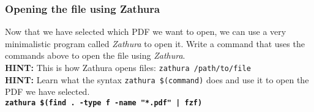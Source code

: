 \documentclass[titlepage, 12pt]{article}
\newcommand{\code}{\texttt}
\begin{document}
	\subsubsection{Opening the file using Zathura}
	Now that we have selected which PDF we want to open, we can use a very minimalistic program called \textit{Zathura} to open it. Write a command that uses the commands above to open the file using \textit{Zathura}.
	\\
	\textbf{HINT:} This is how Zathura opens files: \code{zathura /path/to/file}
	\\
	\textbf{HINT:} Learn what the syntax \code{zathura \$(command)} does and use it to open the PDF we have selected.
	\\
	\textbf{\code{zathura \$(find . -type f -name "*.pdf" | fzf)}}
\end{document}
